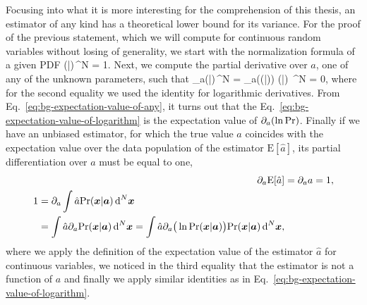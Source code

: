 Focusing into what it is more interesting for the comprehension of this thesis, an estimator of any kind has a theoretical lower bound for its variance.
For the proof of the previous statement, which we will compute for continuous random variables without losing of generality, we start with the normalization formula of a given PDF
\be
  \int \prob(|)\,^N = 1.
\ee
Next, we compute the partial derivative over $a$, one of any of the unknown parameters, such that
\be
  \label{eq:bg-expectation-value-of-logarithm}
  \int \partial_a\prob(|)\,^N = \int \partial_a\big(\ln  \prob(|)\big) \prob(|) \,^N = 0,
\ee
where for the second equality we used the identity for logarithmic derivatives.
From Eq.~\eqref{eq:bg-expectation-value-of-any}, it turns out that the Eq.~\eqref{eq:bg-expectation-value-of-logarithm} is the expectation value of $\partial_a(\ln\text{Pr})$.
Finally if we have an unbiased estimator, for which the true value $a$ coincides with the expectation value over the data population of the estimator $\text{E}[\hat{a}]$, its partial differentiation over $a$ must be equal to one,
\begin{align}
  \partial_a\text{E}[\hat{a}] &= \partial_a a = 1, \\
  \label{eq:bg-expectation-of-estimator-derivated}
  \begin{split}
    1 &= \partial_a \int \hat{a} \text{Pr}(\boldsymbol{x}|\boldsymbol{a})\,\text{d}^N\boldsymbol{x} \\
      &=  \int \hat{a} \partial_a\text{Pr}(\boldsymbol{x}|\boldsymbol{a})\,\text{d}^N\boldsymbol{x} =  \int \hat{a} \partial_a\big(\ln  \text{Pr}(\boldsymbol{x}|\boldsymbol{a})\big) \text{Pr}(\boldsymbol{x}|\boldsymbol{a}) \,\text{d}^N\boldsymbol{x},
  \end{split}
\end{align}
where we apply the definition of the expectation value of the estimator $\hat{a}$ for continuous variables, we noticed in the third equality that the estimator is not a function of $a$ and finally we apply similar identities as in Eq.~\eqref{eq:bg-expectation-value-of-logarithm}.

